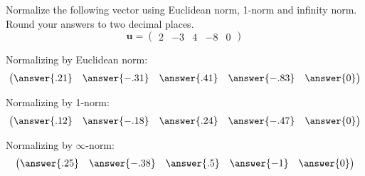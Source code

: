 \documentclass{ximera}
\author{Parisa Fatheddin}
\begin{document}
\begin{exercise}

Normalize the following vector using Euclidean norm, 1-norm and infinity norm. Round your answers to two decimal places.
\[ \textbf{u} = \begin{pmatrix} 2 & -3& 4 & -8 & 0\end{pmatrix}
\]

\begin{prompt}
Normalizing by Euclidean norm:
\[ \begin{pmatrix}
\answer{.21} & \answer{-.31} & \answer{.41} & \answer{-.83} & \answer{0}
\end{pmatrix}\]

Normalizing by 1-norm:
\[
\begin{pmatrix}
\answer{.12} & \answer{-.18} & \answer{.24} & \answer{-.47} & \answer{0}
\end{pmatrix}\]

Normalizing by $\infty$-norm:
\[ \begin{pmatrix}
\answer{.25} & \answer{-.38} & \answer{.5} & \answer{-1} & \answer{0}
\end{pmatrix}\]
\end{prompt}
\end{exercise}
\end{document}
